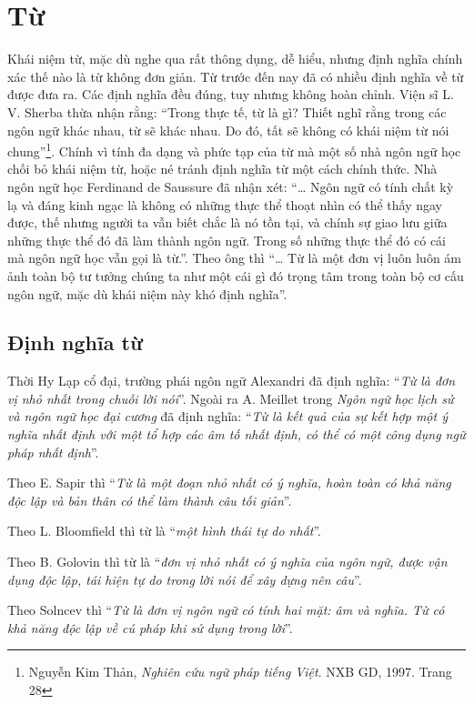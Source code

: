\documentclass[a4paper,oneside,14pt]{extbook} %
\begin{document}
\section{Từ}

Khái niệm từ, mặc dù nghe qua rất thông dụng, dễ hiểu, nhưng định
nghĩa chính xác thế nào là từ không đơn giản. Từ trước đến nay đã có
nhiều định nghĩa về từ được đưa ra. Các định nghĩa đều đúng, tuy nhưng
không hoàn chỉnh. Viện sĩ L. V. Sherba thừa nhận rằng: ``Trong thực
tế, từ là gì? Thiết nghĩ rằng trong các ngôn ngữ khác nhau, từ sẽ khác
nhau. Do đó, tất sẽ không có khái niệm từ nói chung''\footnote{Nguyễn
  Kim Thản, {\em Nghiên cứu ngữ pháp tiếng Việt}. NXB GD, 1997. Trang 28}.
Chính vì tính đa dạng và phức tạp của từ mà một số nhà ngôn ngữ học
chối bỏ khái niệm từ, hoặc né tránh định nghĩa từ một cách chính
thức. Nhà ngôn ngữ học Ferdinand de Saussure đã nhận xét: ``\ldots{}
Ngôn ngữ có tính chất kỳ lạ và đáng kinh ngạc là không có những thực
thể thoạt nhìn có thể thấy ngay được, thế nhưng người ta vẫn biết chắc
là nó tồn tại, và chính sự giao lưu giữa những thực thể đó đã làm
thành ngôn ngữ. Trong số những thực thể đó có cái mà ngôn ngữ học vẫn
gọi là từ.''. Theo ông thì ``\ldots{} Từ là một đơn vị luôn luôn ám ảnh
toàn bộ tư tưởng chúng ta như một cái gì đó trọng tâm trong toàn bộ cơ
cấu ngôn ngữ, mặc dù khái niệm này khó định nghĩa''.


\subsection{Định nghĩa từ}

Thời Hy Lạp cổ đại, trường phái ngôn ngữ Alexandri đã định nghĩa: ``\textit{Từ
là đơn vị nhỏ nhất trong chuỗi lời nói}''. Ngoài ra A. Meillet trong
\textit{Ngôn ngữ học lịch sử và ngôn ngữ học đại cương} đã định nghĩa: ``\textit{Từ
là kết quả của sự kết hợp một ý nghĩa nhất định với một tổ hợp các âm
tố nhất định, có thể có một công dụng ngữ pháp nhất định}''.

Theo E. Sapir thì ``\textit{Từ là một đoạn nhỏ nhất có ý nghĩa, hoàn toàn có
khả năng độc lập và bản thân có thể làm thành câu tối giản}''. 

Theo L. Bloomfield thì từ là ``\textit{một hình thái tự do nhất}''.

Theo B. Golovin thì từ là ``\textit{đơn vị nhỏ nhất có ý nghĩa của ngôn ngữ,
được vận dụng độc lập, tái hiện tự do trong lời nói để xây dựng nên
câu}''.  

Theo Solncev thì ``\textit{Từ là đơn vị ngôn ngữ có tính hai mặt: âm và
nghĩa. Từ có khả năng độc lập về cú pháp khi sử dụng trong lời}''. 
\end{document}
